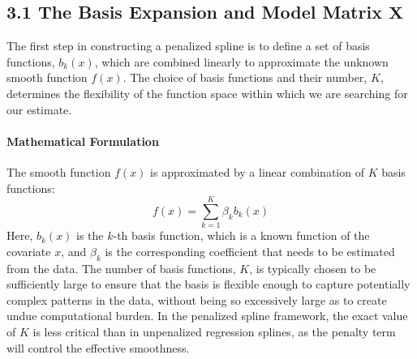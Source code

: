 \documentclass[11pt, a4paper]{article}
\begin{document}
\subsection{3.1 The Basis Expansion and Model Matrix $\mathbf{X}$}
The first step in constructing a penalized spline is to define a set of basis functions, $b_k(x)$, which are combined linearly to approximate the unknown smooth function $f(x)$. The choice of basis functions and their number, $K$, determines the flexibility of the function space within which we are searching for our estimate.

\paragraph{Mathematical Formulation}
The smooth function $f(x)$ is approximated by a linear combination of $K$ basis functions:
\[ f(x) = \sum_{k=1}^{K} \beta_k b_k(x) \]
Here, $b_k(x)$ is the $k$-th basis function, which is a known function of the covariate $x$, and $\beta_k$ is the corresponding coefficient that needs to be estimated from the data. The number of basis functions, $K$, is typically chosen to be sufficiently large to ensure that the basis is flexible enough to capture potentially complex patterns in the data, without being so excessively large as to create undue computational burden. In the penalized spline framework, the exact value of $K$ is less critical than in unpenalized regression splines, as the penalty term will control the effective smoothness.
\end{document}
